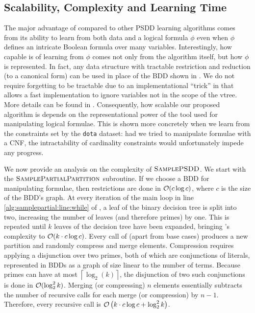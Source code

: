 \subsection{Scalability, Complexity and Learning Time}

The major advantage of  compared to other PSDD learning algorithms comes from
its ability to learn from both data and a logical formula $\phi$ even when $\phi$ defines an
intricate Boolean formula over many variables. Interestingly, how capable  is
of learning from $\phi$ comes not only from the algorithm itself, but how $\phi$ is represented. In
fact, any data structure with tractable restriction and reduction (to a canonical form) can be used
in place of the BDD shown in . We do not require forgetting to be tractable
due to an implementational ``trick'' in  that allows a fast implementation to
ignore variables not in the scope of the vtree. More details can be found in
. Consequently, how scalable our proposed algorithm is depends on the
representational power of the tool used for manipulating logical formulae. This is shown more
concretely when we learn from the constraints set by the \texttt{dota} dataset: had we tried to
manipulate formulae with a CNF, the intractability of cardinality constraints would unfortunately
impede any progress.

We now provide an analysis on the complexity of $\textproc{SamplePSDD}$. We start with the
$\textproc{SamplePartialPartition}$ subroutine. If we choose a BDD for manipulating formulae, then
restrictions are done in $\mathcal{O}(c\log c)$, where $c$ is the size of the BDD's graph. At every
iteration of the main loop in line \ref{alg:samplepartial:line:while} of ,
a leaf of the binary decision tree is split into two, increasing the number of leaves (and
therefore primes) by one. This is repeated until $k$ leaves of the decision tree have been
expanded, bringing 's complexity to $\mathcal{O}(k\cdot c\log c)$. Every
call of  (apart from base cases) produces a new partition and randomly
compress and merge elements. Compression requires applying a disjunction over two primes, both of
which are conjunctions of literals, represented in BDDs as a graph of size linear to the number of
terms. Because primes can have at most $\left\lceil\log_2(k)\right\rceil$, the disjunction of two
such conjunctions is done in $\mathcal{O}(\log_2^2 k)$. Merging (or compressing) $n$ elements
essentially subtracts the number of recursive calls for each merge (or compression) by $n-1$.
Therefore, every  recursive call is $\mathcal{O}\left(k\cdot c\log c+\log_2^2 k
\right)$.

